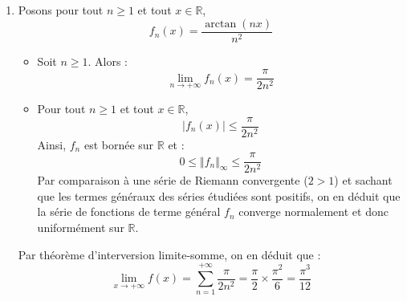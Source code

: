 \documentclass[a4paper,10pt]{report}
\begin{document}
\corr \begin{enumerate}
\item Posons pour tout $n \geq 1$ et tout $x \in \mathbb{R}$,
$$ f_n(x) =  \dfrac{\arctan(nx)}{n^2}$$
\begin{itemize}
\item Soit $n \geq 1$. Alors :
$$ \lim_{n \rightarrow + \infty} f_n(x) = \dfrac{\pi}{2 n^2} $$
\item Pour tout $n \geq 1$ et tout $x \in \mathbb{R}$,
$$ \vert f_n(x) \vert \leq \dfrac{\pi}{2n^2}$$
Ainsi, $f_n$ est bornée sur $\mathbb{R}$ et :
$$ 0 \leq \Vert f_n \Vert_{ \infty} \leq \dfrac{\pi}{2n^2}$$
Par comparaison à une série de Riemann convergente ($2>1$) et sachant que les termes généraux des séries étudiées sont positifs, on en déduit que la série de fonctions de terme général $f_n$ converge normalement et donc uniformément sur $\mathbb{R}$.
\end{itemize}
Par théorème d'interversion limite-somme, on en déduit que :
$$ \lim_{x \rightarrow + \infty} f(x) = \sum_{n=1}^{+ \infty} \dfrac{\pi}{2n^2} = \dfrac{\pi}{2} \times \dfrac{\pi^2}{6} = \dfrac{\pi^3}{12}$$


\end{enumerate}
\end{document}
